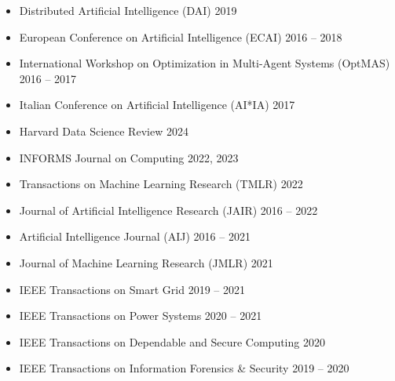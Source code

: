 \begin{itemize}
  \item Distributed Artificial Intelligence (DAI) 
  \hfill {2019}

  \item European Conference on Artificial Intelligence (ECAI) 
  \hfill {2016 -- 2018}

  \item International Workshop on Optimization in Multi-Agent Systems (OptMAS) 
  \hfill {2016 -- 2017}

  \item Italian Conference on Artificial Intelligence (AI*IA) 
  \hfill {2017}
\end{itemize}


\begin{itemize}
  \item Harvard Data Science Review \hfill{2024} 

  \item INFORMS Journal on Computing \hfill{2022, 2023}
  
  \item  Transactions on Machine Learning Research (TMLR) \hfill{2022}

  \item Journal of Artificial Intelligence Research (JAIR) \hfill{2016 -- 2022}

  \item Artificial Intelligence Journal (AIJ) \hfill{2016 -- 2021}

  \item Journal of Machine Learning Research (JMLR) \hfill{2021}
 
  \item IEEE Transactions on Smart Grid \hfill{2019 -- 2021}

  \item IEEE Transactions on Power Systems \hfill{2020 -- 2021}

  \item IEEE Transactions on Dependable and Secure Computing \hfill{2020}

  \item IEEE Transactions on Information Forensics \& Security \hfill{2019 -- 2020}


\end{itemize}
